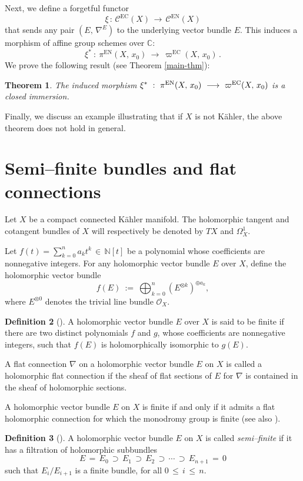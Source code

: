 \documentclass[12pt]{amsart}
\newtheorem{theorem}{Theorem}[section]
\theoremstyle{definition}
\newtheorem{definition}[theorem]{Definition}
\numberwithin{equation}{section}
\newcommand{\C}{\mathbb{C}}
\newcommand{\N}{\mathbb{N}}
\newcommand{\EC}{\mathcal{C}^\mathrm{EC}}
\begin{document}
Next, we define a forgetful functor 
$$
\xi \,:\, \EC(X) \,\longrightarrow\, \mathcal{C}^{\mathrm{EN}}(X)
$$
that sends any pair $(E,\, \nabla^E)$ to the underlying vector bundle $E$. This induces
a morphism of affine group schemes over $\C$:
$$
\xi^* \ :\ \pi^{\mathrm{EN}}(X,\,x_0) \ \longrightarrow\ \varpi^{\mathrm{EC}}(X,\, x_0)\,.
$$
We prove the following result (see Theorem \ref{main-thm}):

\begin{theorem}
The induced morphism 
$\xi^* \ :\ \pi^{{\rm EN}}(X,\,x_0) \ \longrightarrow\ \varpi^{\rm EC}(X,\, x_0)$ 
is a closed immersion.
\end{theorem}

Finally, we discuss an example illustrating that if $X$ is not K\"ahler, the above theorem 
does not hold in general.

\section{Semi--finite bundles and flat connections}\label{sec-2}

Let $X$ be a compact connected K\"ahler manifold. The holomorphic tangent and cotangent bundles
of $X$ will respectively be denoted by $TX$ and $\Omega_X^1$.

Let $f(t) = \sum_{k=0}^n a_k t^k\,\in\, \N[t]$ be a polynomial
whose coefficients are nonnegative integers. For any holomorphic vector bundle
$E$ over $X$, define the holomorphic vector bundle
$$
f(E)\ :=\ \bigoplus_{k=0}^n (E^{\otimes k})^{\oplus a_k},
$$
where $E^{\otimes 0}$ denotes the trivial line bundle ${\mathcal O}_X$.

\begin{definition}[{\cite{No}}]\label{def-finite}
A holomorphic vector bundle $E$ over $X$ is said to be finite if there are two distinct polynomials $f$ and $g$,
whose coefficients are nonnegative integers, such that $f(E)$ is holomorphically isomorphic to $g(E)$.
\end{definition} 

A flat connection $\nabla$ on a holomorphic vector bundle $E$ on $X$ is called a holomorphic flat connection
if the sheaf of flat sections of $E$ for $\nabla$ is contained in the sheaf of holomorphic sections.

A holomorphic vector bundle $E$ on $X$ is finite if and only if it admits a flat
holomorphic connection for which the monodromy group is finite \cite{No} (see also
\cite{BHS}).

\begin{definition}[{\cite{Ot}}]\label{def-semifinite}
A holomorphic vector bundle $E$ on $X$ is called \textit{semi--finite} if it has a filtration of holomorphic subbundles 
$$
E\,=\,E_0\,\supset\, E_1 \,\supset\, E_2 \,\supset\,\cdots\, \supset\, E_{n+1}\,=\,0
$$ such that $E_i/E_{i+1}$ is a finite bundle, for all $0\, \leq\, i\, \leq\, n$.
\end{definition} 
\end{document}
